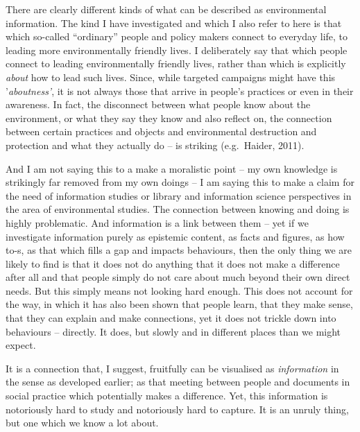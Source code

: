 \documentclass[a4paper,
fontsize=11pt,
oneside,
numbers=noperiodatend,
parskip=half-,
bibliography=totoc,
final
]{scrartcl}
\begin{document}
There are clearly different kinds of what can be described as
environmental information. The kind I have investigated and which I also
refer to here is that which so-called \enquote{ordinary} people and
policy makers connect to everyday life, to leading more environmentally
friendly lives. I deliberately say that which people connect to leading
environmentally friendly lives, rather than which is explicitly
\emph{about} how to lead such lives. Since, while targeted campaigns
might have this '\emph{aboutness'}, it is not always those that arrive
in people's practices or even in their awareness. In fact, the
disconnect between what people know about the environment, or what they
say they know and also reflect on, the connection between certain
practices and objects and environmental destruction and protection and
what they actually do -- is striking (e.g.~Haider, 2011).

And I am not saying this to a make a moralistic point -- my own
knowledge is strikingly far removed from my own doings -- I am saying
this to make a claim for the need of information studies or library and
information science perspectives in the area of environmental studies.
The connection between knowing and doing is highly problematic. And
information is a link between them -- yet if we investigate information
purely as epistemic content, as facts and figures, as how to-s, as that
which fills a gap and impacts behaviours, then the only thing we are
likely to find is that it does not do anything that it does not make a
difference after all and that people simply do not care about much
beyond their own direct needs. But this simply means not looking hard
enough. This does not account for the way, in which it has also been
shown that people learn, that they make sense, that they can explain and
make connections, yet it does not trickle down into behaviours --
directly. It does, but slowly and in different places than we might
expect.

It is a connection that, I suggest, fruitfully can be visualised as
\emph{information} in the sense as developed earlier; as that meeting
between people and documents in social practice which potentially makes
a difference. Yet, this information is notoriously hard to study and
notoriously hard to capture. It is an unruly thing, but one which we
know a lot about.
\end{document}
